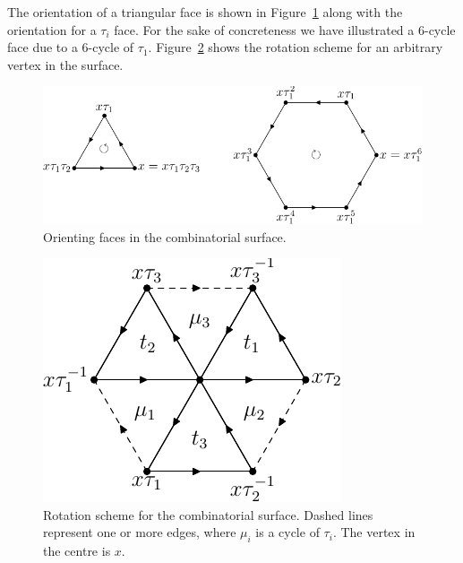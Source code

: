 \documentclass[12pt,amstags,fleqn]{article}
\theoremstyle{plain}
\theoremstyle{definition}
\theoremstyle{definition}
\begin{document}
The orientation of a triangular face is
shown in Figure~\ref{figTwoOrientations} along with the orientation for
a $\tau_i$ face. For the sake of concreteness we have illustrated a
$6$-cycle face due to a $6$-cycle of $\tau_1$. 
Figure~\ref{figDrapalRotationScheme} shows
the rotation scheme for an arbitrary vertex in the surface.
\begin{figure}[htb]
\begin{center}
\includegraphics{drRotationScheme-1.pdf}
\end{center}
\caption{Orienting faces in the combinatorial surface.}
\label{figTwoOrientations}
\end{figure}
\begin{figure}[htb]
\begin{center}
\includegraphics{drRotationScheme-2.pdf}
\end{center}
\caption{Rotation scheme for the combinatorial surface. Dashed
lines represent one or more edges, where $\mu_i$ is a cycle of $\tau_i$.
The vertex in the centre is $x$.}
\label{figDrapalRotationScheme}
\end{figure}
\end{document}
